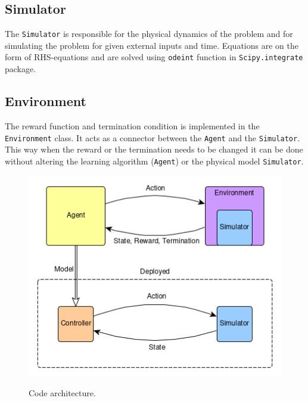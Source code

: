 \documentclass{LTHtwocol} %
\begin{document}
\subsection{Simulator}
The \texttt{Simulator} is responsible for the physical dynamics of the problem and for simulating the problem for given external inputs and time.
Equations are on the form of RHS-equations and are solved using \texttt{odeint} function in \texttt{Scipy.integrate} package.

\subsection{Environment}
The reward function and termination condition is implemented in the \texttt{Environment} class.
It acts as a connector between the \texttt{Agent} and the \texttt{Simulator}.
This way when the reward or the termination needs to be changed it can be done without altering the learning algorithm (\texttt{Agent}) or the physical model \texttt{Simulator}.



\begin{figure}[H]
	\centering
	\includegraphics[width=0.9\columnwidth]{figures/CodeStructure.png}
	\label{fig:code_architecture}
	\caption{Code architecture.}
\end{figure}
\end{document}
